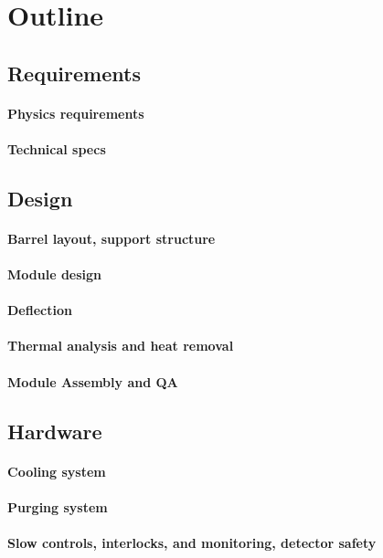 \section{Outline}
\subsection{Requirements} 
\paragraph{Physics requirements} 
\paragraph{Technical specs} 
\subsection{Design}
\paragraph{Barrel layout, support structure}
\paragraph{Module design}
\paragraph{Deflection}
\paragraph{Thermal analysis and heat removal}
\paragraph{Module Assembly and QA}
\subsection{Hardware}
\paragraph{Cooling system}
\paragraph{Purging system}
\paragraph{Slow controls, interlocks, and monitoring, detector safety}

